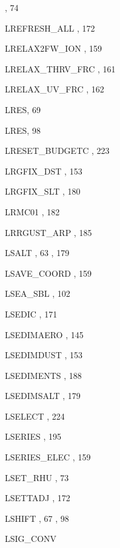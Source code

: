 \begin{theindex}
    \subitem {},  74
  \item LREFRESH\_ALL
    \subitem {},  172
  \item LRELAX2FW\_ION
    \subitem {},  159
  \item LRELAX\_THRV\_FRC
    \subitem {},  161
  \item LRELAX\_UV\_FRC
    \subitem {},  162
  \item LRES, 69
  \item LRES, 98
  \item LRESET\_BUDGETC
    \subitem {},  223
  \item LRGFIX\_DST
    \subitem {},  153
  \item LRGFIX\_SLT
    \subitem {},  180
  \item LRMC01
    \subitem {},  182
  \item LRRGUST\_ARP
    \subitem {},  185
  \item LSALT
    \subitem {},  63
    \subitem {},  179
  \item LSAVE\_COORD
    \subitem {},  159
  \item LSEA\_SBL
    \subitem {},  102
  \item LSEDIC
    \subitem {},  171
  \item LSEDIMAERO
    \subitem {},  145
  \item LSEDIMDUST
    \subitem {},  153
  \item LSEDIMENTS
    \subitem {},  188
  \item LSEDIMSALT
    \subitem {},  179
  \item LSELECT
    \subitem {},  224
  \item LSERIES
    \subitem {},  195
  \item LSERIES\_ELEC
    \subitem {},  159
  \item LSET\_RHU 
    \subitem {},  73
  \item LSETTADJ
    \subitem {},  172
  \item LSHIFT
    \subitem {},  67
    \subitem {},  98
  \item LSIG\_CONV

\end{theindex}
